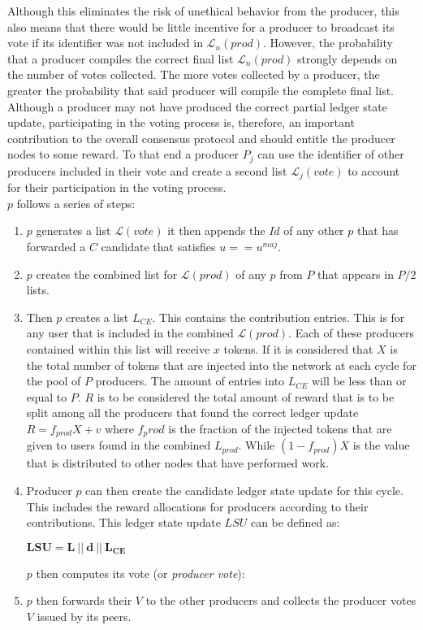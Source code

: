 \documentclass{article}
\begin{document}
Although this eliminates the risk of unethical behavior from the producer, this also means that there would be little incentive for a producer to broadcast its vote if its identifier was not included in $\mathcal{L}_n(prod)$. However, the probability that a producer compiles the correct final list $\mathcal{L}_n(prod)$ strongly depends on the number of votes collected. The more votes collected by a producer, the greater the probability that said producer will compile the complete final list. Although a producer may not have produced the correct partial ledger state update, participating in the voting process is, therefore, an important contribution to the overall consensus protocol and should entitle the producer nodes to some reward. To that end a producer $P_j$ can use the identifier of other producers included in their vote and create a second list $\mathcal{L}_j(vote)$ to account for their participation in the voting process. \\
 
$p$ follows a series of steps:

\begin{enumerate}
\item $p$ generates a list $\mathcal{L}(vote)$ it then appends the $Id$ of any other $p$ that has forwarded a $C$ candidate that satisfies $u == u^{maj}$. 
\item $p$ creates the combined list for $\mathcal{L}(prod)$ of any $p$ from $P$ that appears in $P/2$ lists. 
\item Then $p$ creates a list $L_{CE}$. This contains the contribution entries. This is for any user that is included in the combined $\mathcal{L}(prod)$. Each of these producers contained within this list will receive $x$ tokens. If it is considered that $X$ is the total number of tokens that are injected into the network at each cycle for the pool of $P$ producers. The amount of entries into $L_{CE}$ will be less than or equal to $P$. $R$ is to be considered the total amount of reward that is to be split among all the producers that found the correct ledger update $R = f_{prod}X + v$ where $f_prod$ is the fraction of the injected tokens that are given to users found in the combined $L_{prod}$. While $(1-f_{prod})X$ is the value that is distributed to other nodes that have performed work. 
\item Producer $p$ can then create the candidate ledger state update for this cycle. This includes the reward allocations for producers according to their contributions. This ledger state update $LSU$ can be defined as:

\begin{center}
$\mathbf{LSU = L~||~d~||~L_{CE}}$
\end{center}


$p$ then computes its vote (or \textit{producer vote}):
\begin{center}
\end{center}


\item $p$ then forwards their $V$ to the other producers and collects the producer votes $V$ issued by its peers.

\end{enumerate}
\end{document}
